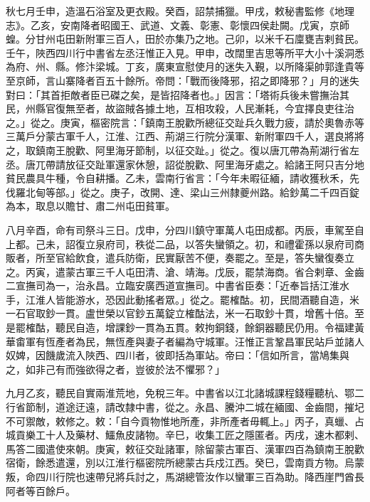 \begin{pinyinscope}
 秋七月壬申，造溫石浴室及更衣殿。癸酉，詔禁捕獵。甲戌，敕秘書監修《地理志》。乙亥，安南降者昭國王、武道、文義、彰憲、彰懷四侯赴闕。戊寅，京師蝗。分甘州屯田新附軍三百人，田於亦集乃之地。己卯，以米千石廩甕吉剌貧民。壬午，陜西四川行中書省左丞汪惟正入見。甲申，改闊里吉思等所平大小十溪洞悉為府、州、縣。修汴梁城。丁亥，廣東宣慰使月的迷失入覲，以所降渠帥郭逢貴等至京師，言山寨降者百五十餘所。帝問：「戰而後降邪，招之即降邪？」月的迷失對曰：「其首拒敵者臣已磔之矣，是皆招降者也。」因言：「塔術兵後未嘗撫治其民，州縣官復無至者，故盜賊各據土地，互相攻殺，人民漸耗，今宜擇良吏往治之。」從之。庚寅，樞密院言：「鎮南王脫歡所總征交趾兵久戰力疲，請於奧魯赤等三萬戶分蒙古軍千人，江淮、江西、荊湖三行院分漢軍、新附軍四千人，選良將將之，取鎮南王脫歡、阿里海牙節制，以征交趾。」從之。復以唐兀帶為荊湖行省左丞。唐兀帶請放征交趾軍還家休憩，詔從脫歡、阿里海牙處之。給諸王阿只吉分地貧民農具牛種，令自耕播。乙未，雲南行省言：「今年未暇征緬，請收獲秋禾，先伐羅北甸等部。」從之。庚子，改開、達、梁山三州隸夔州路。給鈔萬二千四百錠為本，取息以贍甘、肅二州屯田貧軍。



 八月辛酉，命有司祭斗三日。戊申，分四川鎮守軍萬人屯田成都。丙辰，車駕至自上都。己未，詔復立泉府司，秩從二品，以答失蠻領之。初，和禮霍孫以泉府司商販者，所至官給飲食，遣兵防衛，民實厭苦不便，奏罷之。至是，答失蠻復奏立之。丙寅，遣蒙古軍三千人屯田清、滄、靖海。戊辰，罷禁海商。省合剌章、金齒二宣撫司為一，治永昌。立臨安廣西道宣撫司。中書省臣奏：「近奉旨括江淮水手，江淮人皆能游水，恐因此動搖者眾。」從之。罷榷酤。初，民間酒聽自造，米一石官取鈔一貫。盧世榮以官鈔五萬錠立榷酤法，米一石取鈔十貫，增舊十倍。至是罷榷酤，聽民自造，增課鈔一貫為五貫。敕拘銅錢，餘銅器聽民仍用。令福建黃華畬軍有恆產者為民，無恆產與妻子者編為守城軍。汪惟正言鞏昌軍民站戶並諸人奴婢，因饑歲流入陜西、四川者，彼即括為軍站。帝曰：「信如所言，當鳩集與之，如非己有而強欲得之者，豈彼於法不懼邪？」



 九月乙亥，聽民自實兩淮荒地，免稅三年。中書省以江北諸城課程錢糧聽杭、鄂二行省節制，道途迂遠，請改隸中書，從之。永昌、騰沖二城在緬國、金齒間，摧圮不可禦敵，敕修之。敕：「自今貢物惟地所產，非所產者毋輒上。」丙子，真蠟、占城貢樂工十人及藥材、鱷魚皮諸物。辛巳，收集工匠之隱匿者。丙戌，速木都剌、馬答二國遣使來朝。庚寅，敕征交趾諸軍，除留蒙古軍百、漢軍四百為鎮南王脫歡宿衛，餘悉遣還，別以江淮行樞密院所總蒙古兵戍江西。癸巳，雲南貢方物。烏蒙叛，命四川行院也速帶兒將兵討之，馬湖總管汝作以蠻軍三百為助。降西崖門酋長阿者等百餘戶。




\end{pinyinscope}
